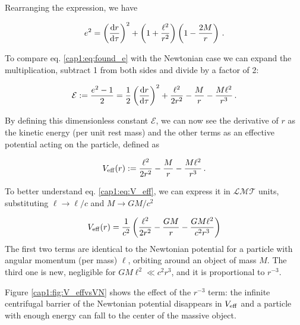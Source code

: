 Rearranging the expression, we have

\begin{equation}
    e^2 = \left(\dv{r}{\tau}\right)^2 + \left(1 + \frac{\ell^2}{r^2}\right)
    \left(1 - \frac{2M}{r} \right) \, .
   \label{cap1:eq:found_e}
\end{equation}

To compare eq. \ref{cap1:eq:found_e} with the Newtonian case we can expand
the multiplication, subtract 1 from both sides and divide by a factor of 2:

\begin{equation}
    \mathcal E := \frac{e^2 - 1}{2} = \frac{1}{2} \left(\dv{r}{\tau}\right)^2
    + \frac{\ell^2}{2 r^2} - \frac{M}{r} - \frac{M \ell^2}{r^3} \, .
    \label{cap1:eq:found_epsilon}
\end{equation}

By defining this dimensionless constant $\mathcal E$, we can now see the
derivative of $r$ as the kinetic energy (per unit rest mass) and the other
terms as an effective potential acting on the particle, defined as

\begin{equation}
    V_{\rm eff}(r)
    := \frac{\ell^2}{2 r^2} - \frac{M}{r} - \frac{M \ell^2}{r^3} \, .
    \label{cap1:eq:V_eff}
\end{equation}

To better understand eq. \ref{cap1:eq:V_eff}, we can express it in
$\mathcal{LMT}$ units, substituting $\ell \rightarrow \ell / c$ and 
$ M \rightarrow G M / c^2$

\begin{equation*}
    V_{\rm eff}(r)
    = \frac{1}{c^2} \left( \frac{\ell^2}{2 r^2} - \frac{G M}{r}
    - \frac{G M \ell^2}{c^2 r^3} \right)
\end{equation*}
The first two terms are identical to the Newtonian potential for a particle
with angular momentum (per mass) $\ell$, orbiting around an object of mass $M$.
The third one is new, negligible for $GM\ell^2 \ll c^2 r^3$, and it is
proportional
to $r^{-3}$.

Figure \ref{cap1:fig:V_effvsVN} shows the effect of the $r^{-3}$ term: the
infinite centrifugal barrier of the Newtonian potential disappears in
$V_{\rm eff}$ and a particle with enough energy can fall to the center of the
massive object.

